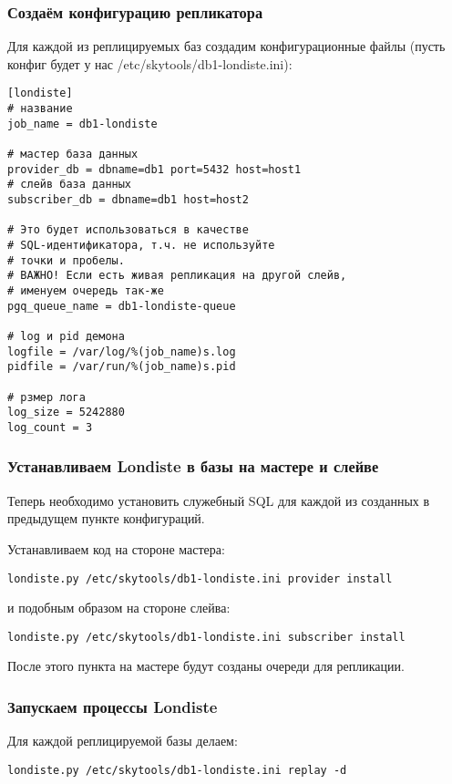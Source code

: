\subsubsection{Создаём конфигурацию репликатора}
Для каждой из реплицируемых баз создадим конфигурационные файлы
(пусть конфиг будет у нас /etc/skytools/db1-londiste.ini):
\begin{lstlisting}[label=lst:londiste9,caption=Создаём конфигурацию репликатора]
[londiste]
# название
job_name = db1-londiste

# мастер база данных
provider_db = dbname=db1 port=5432 host=host1
# слейв база данных
subscriber_db = dbname=db1 host=host2

# Это будет использоваться в качестве
# SQL-идентификатора, т.ч. не используйте
# точки и пробелы.
# ВАЖНО! Если есть живая репликация на другой слейв,
# именуем очередь так-же
pgq_queue_name = db1-londiste-queue

# log и pid демона
logfile = /var/log/%(job_name)s.log
pidfile = /var/run/%(job_name)s.pid

# рзмер лога
log_size = 5242880
log_count = 3
\end{lstlisting}

\subsubsection{Устанавливаем Londiste в базы на мастере и слейве}
Теперь необходимо установить служебный SQL для каждой из созданных в предыдущем
пункте конфигураций.

Устанавливаем код на стороне мастера:
\begin{lstlisting}[label=lst:londiste10,caption=Londiste]
londiste.py /etc/skytools/db1-londiste.ini provider install
\end{lstlisting}
и подобным образом на стороне слейва:
\begin{lstlisting}[label=lst:londiste11,caption=Londiste]
londiste.py /etc/skytools/db1-londiste.ini subscriber install
\end{lstlisting}

После этого пункта на мастере будут созданы очереди для репликации.

\subsubsection{Запускаем процессы Londiste}
Для каждой реплицируемой базы делаем:
\begin{lstlisting}[label=lst:londiste12,caption=Запускаем]
londiste.py /etc/skytools/db1-londiste.ini replay -d
\end{lstlisting}

